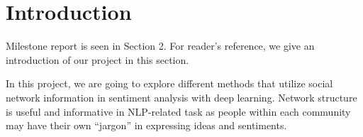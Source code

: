 
\section{Introduction}


Milestone report is seen in Section 2. For reader's reference, we give an introduction of our project in this section.


In this project, we are going to explore different methods that utilize social network information in sentiment analysis with deep learning. Network structure is useful and informative in NLP-related task as people within each community may have their own ``jargon'' in expressing ideas and sentiments. 
